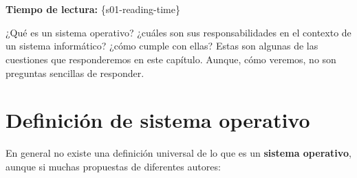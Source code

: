 \section{}

\textbf{Tiempo de lectura:} \{s01-reading-time\}

¿Qué es un sistema operativo? ¿cuáles son sus responsabilidades en el
contexto de un sistema informático? ¿cómo cumple con ellas? Estas son
algunas de las cuestiones que responderemos en este capítulo. Aunque,
cómo veremos, no son preguntas sencillas de responder.

\section{Definición de sistema
operativo}\label{_definiciuxf3n_de_sistema_operativo}

En general no existe una definición universal de lo que es un
\textbf{{}sistema operativo}, aunque si muchas propuestas de diferentes
autores:

